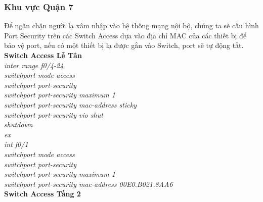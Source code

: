 \documentclass[a4paper, 12pt]{article}
\begin{document}
\subsubsection{Khu vực Quận 7}
\hspace*{0.25cm}Để ngăn chặn người lạ xâm nhập vào hệ thống mạng nội bộ, chúng ta sẽ cấu hình Port Security trên các Switch Access dựa vào địa chỉ MAC của các thiết bị để bảo vệ port, nếu có một thiết bị lạ được gắn vào Switch, port sẽ tự động tắt.\\
\hspace*{1cm}\textbf{Switch Access Lễ Tân}\\
\hspace*{2cm}\textit{inter range f0/4-24\\
\hspace*{2cm}switchport mode access\\
\hspace*{2cm}switchport port-security\\
\hspace*{2cm}switchport port-security maximum 1\\
\hspace*{2cm}switchport port-security mac-address sticky\\
\hspace*{2cm}switchport port-security vio shut\\
\hspace*{2cm}shutdown\\
\hspace*{2cm}ex\\
\hspace*{2cm}int f0/1\\
\hspace*{2cm}switchport mode access\\
\hspace*{2cm}switchport port-security\\
\hspace*{2cm}switchport port-security maximum 1\\
\hspace*{2cm}switchport port-security mac-address 00E0.B021.8AA6\\}
\hspace*{1cm}\textbf{Switch Access Tầng 2}\\
\end{document}
